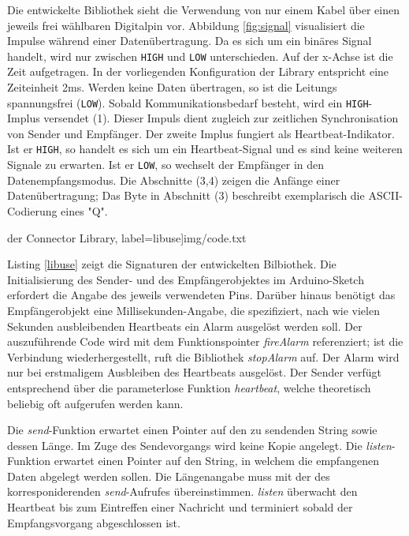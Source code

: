 \documentclass[a4paper, 11pt]{article}
\begin{document}
Die entwickelte Bibliothek sieht die Verwendung von nur einem Kabel über einen jeweils frei wählbaren Digitalpin vor. Abbildung \ref{fig:signal} visualisiert die Impulse während einer Datenübertragung. Da es sich um ein binäres Signal handelt, wird nur zwischen \texttt{HIGH} und \texttt{LOW} unterschieden. Auf der x-Achse ist die Zeit aufgetragen. In der vorliegenden Konfiguration der Library entspricht eine Zeiteinheit 2ms. Werden keine Daten übertragen, so ist die Leitungs spannungsfrei (\texttt{LOW}). Sobald Kommunikationsbedarf besteht, wird ein \texttt{HIGH}-Implus versendet (1). Dieser Impuls dient zugleich zur zeitlichen Synchronisation von Sender und Empfänger. Der zweite Implus fungiert als Heartbeat-Indikator. Ist er \texttt{HIGH}, so handelt es sich um ein Heartbeat-Signal und es sind keine weiteren Signale zu erwarten. Ist er \texttt{LOW}, so wechselt der Empfänger in den Datenempfangsmodus. Die Abschnitte (3,4) zeigen die Anfänge einer Datenübertragung; Das Byte in Abschnitt (3) beschreibt exemplarisch die ASCII-Codierung eines "Q". \newline

\noindent\begin{minipage}{\textwidth}
     der Connector Library, label=libuse]{img/code.txt}
\end{minipage}

Listing \ref{libuse} zeigt die Signaturen der entwickelten Bilbiothek. Die Initialisierung des Sender- und des Empfängerobjektes im Arduino-Sketch erfordert die Angabe des jeweils verwendeten Pins. Darüber hinaus benötigt das Empfängerobjekt eine Millisekunden-Angabe, die spezifiziert, nach wie vielen Sekunden ausbleibenden Heartbeats ein Alarm ausgelöst werden soll. Der auszuführende Code wird mit dem Funktionspointer \textit{fireAlarm} referenziert; ist die Verbindung wiederhergestellt, ruft die Bibliothek  \textit{stopAlarm} auf. Der Alarm wird nur bei erstmaligem Ausbleiben des Heartbeats ausgelöst. Der Sender verfügt entsprechend über die parameterlose Funktion \textit{heartbeat}, welche theoretisch beliebig oft aufgerufen werden kann.

Die \textit{send}-Funktion erwartet einen Pointer auf den zu sendenden String sowie dessen Länge. Im Zuge des Sendevorgangs wird keine Kopie angelegt. Die \textit{listen}-Funktion erwartet einen Pointer auf den String, in welchem die empfangenen Daten abgelegt werden sollen. Die Längenangabe muss mit der des korresponiderenden \textit{send}-Aufrufes übereinstimmen. \textit{listen} überwacht den Heartbeat bis zum Eintreffen einer Nachricht und terminiert sobald der Empfangsvorgang abgeschlossen ist.
\end{document}
